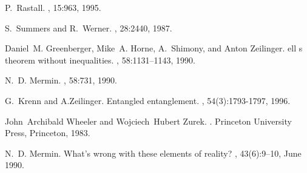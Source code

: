\begin{thebibliography}{10}
P.~Rastall.
, 15:963, 1995.

S.~Summers and R.~Werner.
, 28:2440, 1987.

Daniel~M. Greenberger, Mike~A. Horne, A.~Shimony, and Anton Zeilinger.
ell s theorem without inequalities.
, 58:1131--1143, 1990.

N.~D. Mermin.
, 58:731, 1990.

G.~Krenn and A.Zeilinger.
\newblock Entangled entanglement.
, 54(3):1793-1797, 1996.


John~Archibald Wheeler and Wojciech~Hubert Zurek.
.
\newblock Princeton University Press, Princeton, 1983.

N.~D. Mermin.
\newblock What's wrong with these elements of reality?
, 43(6):9--10, June 1990.

\end{thebibliography}


